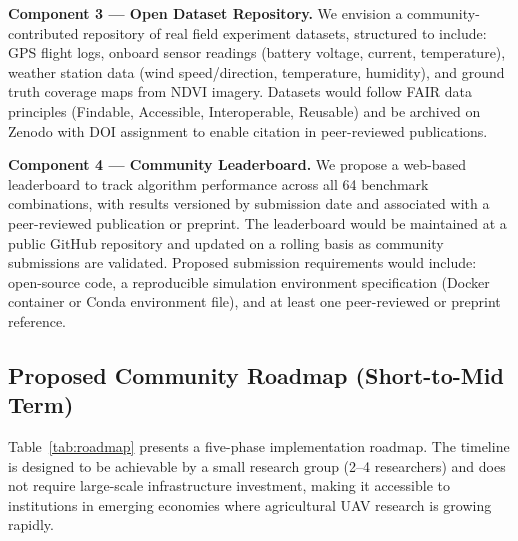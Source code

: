 \documentclass[review,3p,times]{elsarticle}
\begin{document}
\textbf{Component 3 --- Open Dataset Repository.} We envision a community-contributed repository of real field experiment datasets, structured to include: GPS flight logs, onboard sensor readings (battery voltage, current, temperature), weather station data (wind speed/direction, temperature, humidity), and ground truth coverage maps from NDVI imagery. Datasets would follow FAIR data principles (Findable, Accessible, Interoperable, Reusable) and be archived on Zenodo with DOI assignment to enable citation in peer-reviewed publications.

\textbf{Component 4 --- Community Leaderboard.} We propose a web-based leaderboard to track algorithm performance across all 64 benchmark combinations, with results versioned by submission date and associated with a peer-reviewed publication or preprint. The leaderboard would be maintained at a public GitHub repository and updated on a rolling basis as community submissions are validated. Proposed submission requirements would include: open-source code, a reproducible simulation environment specification (Docker container or Conda environment file), and at least one peer-reviewed or preprint reference.

\subsection{Proposed Community Roadmap (Short-to-Mid Term)}

Table~\ref{tab:roadmap} presents a five-phase implementation roadmap. The timeline is designed to be achievable by a small research group (2--4 researchers) and does not require large-scale infrastructure investment, making it accessible to institutions in emerging economies where agricultural UAV research is growing rapidly.
\end{document}
